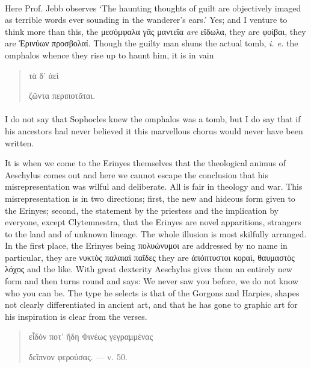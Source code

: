 \documentclass[a4paper, 11pt, oneside, polutonikogreek, english]{article}
\begin{document}
\paragraph{}
Here Prof. Jebb observes `The haunting thoughts of guilt are objectively imaged as terrible words ever sounding in the wanderer's ears.' Yes; and I venture to think more than this, the μεσόμφαλα γᾶς μαντεῖα \emph{are} εἴδωλα, they are φοίβαι, they are Ἐρινύων προσβολαί. Though the guilty man shuns the actual tomb, \emph{i. e.} the omphalos whence they rise up to haunt him, it is in vain
\begin{quotation}
\large
\hspace*{20mm}τὰ δ' ἀεὶ

ζῶντα περιποτᾶται.
\end{quotation}
\paragraph{}
I do not say that Sophocles knew the omphalos was a tomb, but I do say that if his ancestors had never believed it this marvellous chorus would never have been written.

It is when we come to the Erinyes themselves that the theological animus of Aeschylus comes out and here we cannot escape the conclusion that his misrepresentation was wilful and deliberate. All is fair in theology and war. This misrepresentation is in two directions; first, the new and hideous form given to the Erinyes; second, the statement by the priestess and the implication by everyone, except Clytemnestra, that the Erinyes are novel apparitions, strangers to the land and of unknown lineage. The whole illusion is most skilfully arranged. In the first place, the Erinyes being πολυώνυμοι are addressed by no name in particular, they are νυκτὸς παλαιαὶ παῖδες they are ἀπόπτυστοι κοραὶ, θαυμαστὸς λόχος and the like. With great dexterity Aeschylus gives them an entirely new form and then turns round and says: We never saw you before, we do not know who you can be. The type he selects is that of the Gorgons and Harpies, shapes not clearly differentiated in ancient art, and that he has gone to graphic art for his inspiration is clear from the verses.
\begin{quotation}
\large
εἶδόν ποτ' ἤδη Φινέως γεγραμμένας

δεῖπνον φερούσας. --- v. 50.
\end{quotation}
\end{document}
